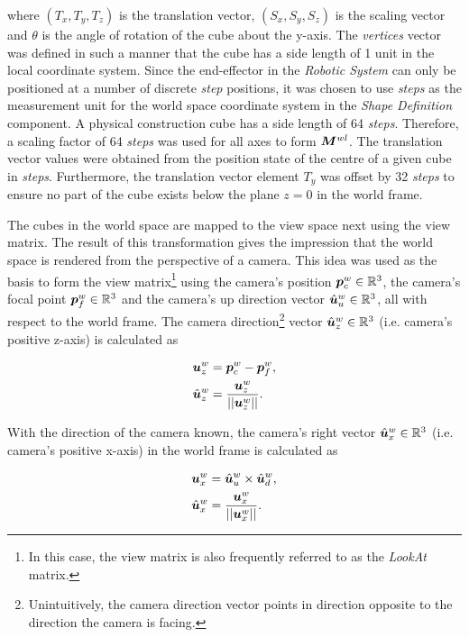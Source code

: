 where $(T_x, T_y, T_z)$ is the translation vector, $(S_x, S_y, S_z)$ is the scaling vector and $\theta$ is the angle of rotation of the cube about the y-axis. The \textit{vertices} vector was defined in such a manner that the cube has a side length of 1 unit in the local coordinate system. Since the end-effector in the \textit{Robotic System} can only be positioned at a number of discrete \textit{step} positions, it was chosen to use \textit{steps} as the measurement unit for the world space coordinate system in the \textit{Shape Definition} component. A physical construction cube has a side length of 64 \textit{steps}. Therefore, a scaling factor of 64 \textit{steps} was used for all axes to form $\bm{M}^{wl}$. The translation vector values were obtained from the position state of the centre of a given cube in \textit{steps}. Furthermore, the translation vector element $T_y$ was offset by 32 \textit{steps} to ensure no part of the cube exists below the plane $z=0$ in the world frame.

The cubes in the world space are mapped to the view space next using the view matrix. The result of this transformation gives the impression that the world space is rendered from the perspective of a camera. This idea was used as the basis to form the view matrix\footnote{In this case, the view matrix is also frequently referred to as the \textit{LookAt} matrix.} using the camera's position $\bm{p}^w_c\in\mathbb{R}^3$, the camera's focal point $\bm{p}^w_f\in\mathbb{R}^3$ and the camera's up direction vector $\hat{\bm{u}}^w_u\in\mathbb{R}^3$, all with respect to the world frame. The camera direction\footnote{Unintuitively, the camera direction vector points in direction opposite to the direction the camera is facing.} vector $\hat{\bm{u}}^w_z\in\mathbb{R}^3$ (i.e. camera's positive z-axis) is calculated as

\begin{align}
	\bm{u}^w_z&=\bm{p}^w_c-\bm{p}^w_f,\\
	\hat{\bm{u}}^w_z&=\frac{\bm{u}^w_z}{||\bm{u}^w_z||}.
	\label{eqn:opengl-camera-z}
\end{align}

With the direction of the camera known, the camera's right vector $\hat{\bm{u}}^w_x\in\mathbb{R}^3$ (i.e. camera's positive x-axis) in the world frame is calculated as

\begin{align}
	\bm{u}^w_x&=\hat{\bm{u}}^w_u\times\hat{\bm{u}}^w_d,\\
	\hat{\bm{u}}^w_x&=\frac{\bm{u}^w_x}{||\bm{u}^w_x||}.
	\label{eqn:opengl-camera-x}
\end{align}

